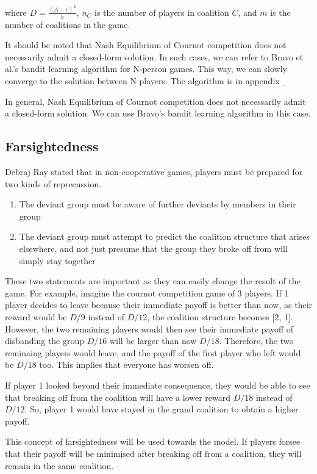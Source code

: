 \documentclass[sigconf,anonymous]{aamas}
\newcommand{\ykc}[1]{{\color{blue} #1}}
\begin{document}
where $D = \frac{(A-c)^2}{b}$, $n_C$ is the number of players in coalition $C$, and $m$ is the number of coalitions in the game. 

It should be noted that Nash Equilibrium of Cournot competition does not necessarily admit a closed-form solution. In such cases, we can refer to Bravo et al.'s bandit learning algorithm for N-person games. This way, we can slowly converge to the solution between N players. The algorithm is in appendix $\_$%

\ykc{In general, Nash Equilibrium of Cournot competition does not necessarily admit a closed-form solution. We can use Bravo's bandit learning algorithm in this case.}

\subsection{Farsightedness} 
Debraj Ray stated that in non-cooperative games, players must be prepared for two kinds of reprecussion. 
\begin{enumerate}
	\item The deviant group must be aware of further deviants by members in their group 
	\item The deviant group must attempt to predict the coalition structure that arises elsewhere, and not just presume that the group they broke off from will simply stay together
\end{enumerate}
These two statements are important as they can easily change the result of the game. For example, imagine the cournot competition game of 3 players. If 1 player decides to leave because their immediate payoff is better than now, as their reward would be $D/9$ instead of $D/12$, the coalition structure becomes [2, 1]. However, the two remaining players would then see their immediate payoff of disbanding the group $D/16$ will be larger than now $D/18$. Therefore, the two reminaing players would leave, and the payoff of the first player who left would be $D/18$ too. This implies that everyone has worsen off. 

If player 1 looked beyond their immediate consequence, they would be able to see that breaking off from the coalition will have a lower reward $D/18$ instead of $D/12$. So, player 1 would have stayed in the grand coalition to obtain a higher payoff. 

This concept of farsightedness will be used towards the model. If players forsee that their payoff will be minimised after breaking off from a coalition, they will remain in the same coalition. 
\end{document}
